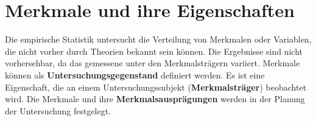 \section{Merkmale und ihre Eigenschaften}
Die empirische Statistik untersucht die Verteilung von Merkmalen oder Variablen, die nicht vorher durch Theorien bekannt sein können.
Die Ergebnisse sind nicht vorhersehbar, da das gemessene unter den Merkmalsträgern variiert.
\newline
Merkmale können als \textbf{Untersuchungsgegenstand} definiert werden. Es ist eine Eigenschaft, die an einem Untersuchungssubjekt (\textbf{Merkmalsträger}) beobachtet wird.
Die Merkmale und ihre \textbf{Merkmalsausprägungen} werden in der Planung der Untersuchung festgelegt.

